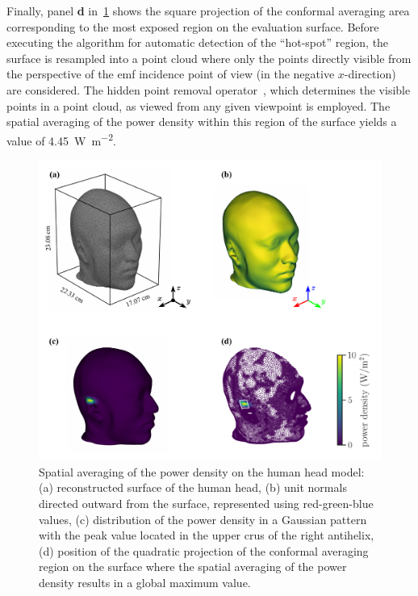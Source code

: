 Finally, panel \textbf{d} in~\cref{fig:head} shows the square projection of the conformal averaging area corresponding to the most exposed region on the evaluation surface.
Before executing the algorithm for automatic detection of the ``hot-spot'' region, the surface is resampled into a point cloud where only the points directly visible from the perspective of the \gls{emf} incidence point of view (in the negative $x$-direction) are considered.
The hidden point removal operator~\cite{Katz2007Direct}, which determines the visible points in a point cloud, as viewed from any given viewpoint is employed.
The spatial averaging of the power density within this region of the surface yields a value of \SI{4.45}{\watt\per\m\squared}.
\begin{figure}[t]
    \centering
    \includegraphics[width=\textwidth]{artwork/head.pdf}
    \caption{Spatial averaging of the power density on the human head model: (a) reconstructed surface of the human head, (b) unit normals directed outward from the surface, represented using red-green-blue values, (c) distribution of the power density in a Gaussian pattern with the peak value located in the upper crus of the right antihelix, (d) position of the quadratic projection of the conformal averaging region on the surface where the spatial averaging of the power density results in a global maximum value.}
    \label{fig:head} 
\end{figure}
